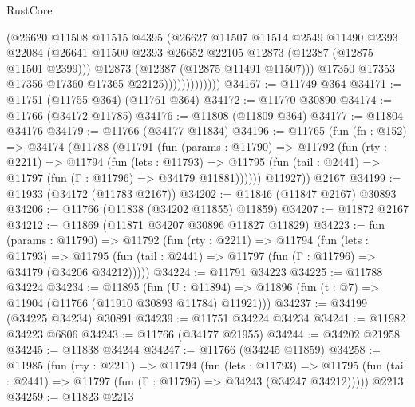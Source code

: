 \begin{lexlean}{RustCore}
\begin{coremodule}
                            (@26620
                              @11508
                              @11515
                              @4395
                              (@26627
                                @11507
                                @11514
                                @2549
                                @11490
                                @2393
                                @22084
                                (@26641
                                  @11500
                                  @2393
                                  @26652
                                  @22105
                                  @12873
                                  (@12387 (@12875 @11501 @2399)))
                                @12873
                                (@12387 (@12875 @11491 @11507)))
                              @17350
                              @17353
                              @17356
                              @17360
                              @17365
                              @22125)))))))))))))
@34167 := @11749 @364
@34171 := @11751 (@11755 @364) (@11761 @364)
@34172 := @11770 @30890
@34174 := @11766 (@34172 @11785)
@34176 := @11808 (@11809 @364)
@34177 := @11804 @34176
@34179 := @11766 (@34177 @11834)
@34196 := @11765
    (fun (fn : @152) =>
    @34174
      (@11788
        (@11791
          (fun (params : @11790) =>
          @11792
            (fun (rty : @2211) =>
            @11794
              (fun (lets : @11793) =>
              @11795 (fun (tail : @2441) => @11797 (fun (Γ : @11796) => @34179 @11881))))))
        @11927))
    @2167
@34199 := @11933 (@34172 (@11783 @2167))
@34202 := @11846 (@11847 @2167) @30893
@34206 := @11766 (@11838 (@34202 @11855) @11859)
@34207 := @11872 @2167
@34212 := @11869 (@11871 @34207 @30896 @11827 @11829)
@34223 := fun (params : @11790) =>
  @11792
    (fun (rty : @2211) =>
    @11794
      (fun (lets : @11793) =>
      @11795 (fun (tail : @2441) => @11797 (fun (Γ : @11796) => @34179 (@34206 @34212)))))
@34224 := @11791 @34223
@34225 := @11788 @34224
@34234 := @11895
    (fun (U : @11894) => @11896 (fun (t : @7) => @11904 (@11766 (@11910 @30893 @11784) @11921)))
@34237 := @34199 (@34225 @34234) @30891
@34239 := @11751 @34224 @34234
@34241 := @11982 @34223 @6806
@34243 := @11766 (@34177 @21955)
@34244 := @34202 @21958
@34245 := @11838 @34244
@34247 := @11766 (@34245 @11859)
@34258 := @11985
    (fun (rty : @2211) =>
    @11794
      (fun (lets : @11793) =>
      @11795 (fun (tail : @2441) => @11797 (fun (Γ : @11796) => @34243 (@34247 @34212)))))
    @2213
@34259 := @11823 @2213

\end{coremodule}
\end{lexlean}
